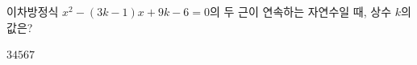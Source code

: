 이차방정식 $x^2-(3k-1)x+9k-6=0$의 두 근이 연속하는 자연수일 때, 상수 $k$의 값은?
\begin{choices32}{$3$}{$4$}{$5$}{$6$}{$7$}\end{choices32}

